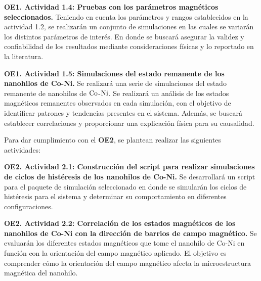 \vspace{10pt}

\textbf{OE1. Actividad 1.4: Pruebas con los parámetros magnéticos seleccionados.} Teniendo en cuenta los parámetros y rangos establecidos en la actividad 1.2, se realizarán un conjunto de simulaciones en las cuales se variarán los distintos parámetros de interés. En donde se buscará asegurar la validez y confiabilidad de los resultados mediante consideraciones físicas y lo reportado en la literatura.

\vspace{10pt}

\textbf{OE1. Actividad 1.5: Simulaciones del estado remanente de los nanohilos de Co-Ni.} Se realizará una serie de simulaciones del estado remanente de nanohilos de $\ce{Co}$-$\ce{Ni}$. Se realizará un análisis de los estados magnéticos remanentes observados en cada simulación, con el objetivo de identificar patrones y tendencias presentes en el sistema. Además, se buscará establecer correlaciones y proporcionar una explicación física para su causalidad.

\vspace{10pt}

Para dar cumplimiento con el \textbf{OE2}, se plantean realizar las siguientes actividades:

\vspace{10pt}

\textbf{OE2. Actividad 2.1: Construcción del script para realizar simulaciones de ciclos de histéresis de los nanohilos de Co-Ni.} Se desarrollará un script para el paquete de simulación seleccionado en donde se simularán los ciclos de histéresis para el sistema y determinar su comportamiento en diferentes configuraciones.

\newpage

\textbf{OE2. Actividad 2.2: Correlación de los estados magnéticos de los nanohilos de Co-Ni con la dirección de barrios de campo magnético.} Se evaluarán los diferentes estados magnéticos que tome el nanohilo de Co-Ni en función con la orientación del campo magnético aplicado. El objetivo es comprender cómo la orientación del campo magnético afecta la microestructura magnética del nanohilo.